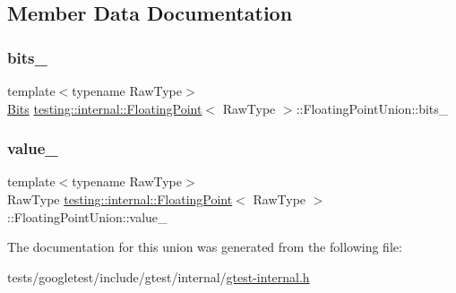 \subsection{Member Data Documentation}
\mbox{\label{uniontesting_1_1internal_1_1FloatingPoint_1_1FloatingPointUnion_aedb69e386f5d624a016f7a781302a2bf}} 
\subsubsection{\texorpdfstring{bits\+\_\+}{bits\_}}
{\footnotesize\ttfamily template$<$typename Raw\+Type$>$ \\
\hyperlink{classtesting_1_1internal_1_1FloatingPoint_abf228bf6cd48f12c8b44c85b4971a731}{Bits} \hyperlink{classtesting_1_1internal_1_1FloatingPoint}{testing\+::internal\+::\+Floating\+Point}$<$ Raw\+Type $>$\+::Floating\+Point\+Union\+::bits\+\_\+}

\mbox{\label{uniontesting_1_1internal_1_1FloatingPoint_1_1FloatingPointUnion_a4ee324889f70577721393e8e1920e4c6}} 
\subsubsection{\texorpdfstring{value\+\_\+}{value\_}}
{\footnotesize\ttfamily template$<$typename Raw\+Type$>$ \\
Raw\+Type \hyperlink{classtesting_1_1internal_1_1FloatingPoint}{testing\+::internal\+::\+Floating\+Point}$<$ Raw\+Type $>$\+::Floating\+Point\+Union\+::value\+\_\+}



The documentation for this union was generated from the following file\+:\begin{DoxyCompactItemize}
\item 
tests/googletest/include/gtest/internal/\hyperlink{gtest-internal_8h}{gtest-\/internal.\+h}\end{DoxyCompactItemize}
